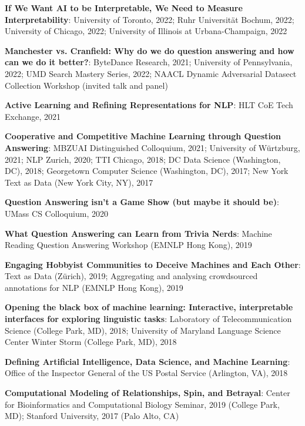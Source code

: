 {{  \begin{enumerate*}
    \item {\bf If We Want AI to be Interpretable, We Need to Measure
        Interpretability}: University of Toronto, 2022; Ruhr
      Universit\"at Bochum, 2022; University of Chicago, 2022;
      University of Illinois at Urbana-Champaign, 2022
    \item {\bf Manchester vs. Cranfield: Why do we do question answering and
how can we do it better?}: ByteDance Research, 2021; University of
Pennsylvania, 2022; UMD Search Mastery Series, 2022; NAACL Dynamic
Adversarial Datasect Collection Workshop (invited talk and panel)
    \item {\bf Active Learning and Refining Representations for NLP}:
      HLT CoE Tech Exchange, 2021
\item {\bf Cooperative and Competitive Machine Learning through
    Question Answering}: MBZUAI Distinguished Colloquium, 2021;
  University of W\"urtzburg, 2021; NLP Zurich, 2020; TTI Chicago, 2018; DC Data Science (Washington, DC), 2018; Georgetown Computer Science (Washington, DC),
  2017; New York Text as Data (New York City, NY), 2017
  \item {\bf Question
      Answering isn't a Game Show (but maybe it should be)}: UMass CS
    Colloquium, 2020
\item {\bf What Question Answering can Learn from Trivia Nerds}:
  Machine Reading Question Answering Workshop (EMNLP Hong Kong), 2019
\item {\bf  Engaging Hobbyist
Communities to Deceive Machines and
Each Other}: Text as Data (Z\"urich), 2019; Aggregating and analysing
crowdsourced annotations for NLP (EMNLP Hong Kong), 2019
\item {\bf Opening the black box of machine learning: Interactive, interpretable interfaces for exploring linguistic tasks}: Laboratory of Telecommunication Science (College Park,
  MD), 2018;  University of Maryland Language Science Center Winter
  Storm (College Park, MD), 2018
\item {\bf Defining Artificial Intelligence, Data Science, and Machine
    Learning}: Office of the Inspector General of the US Postal
  Service (Arlington, VA), 2018
\item {\bf Computational Modeling of Relationships, Spin, and
    Betrayal}: Center for Bioinformatics and Computational Biology
  Seminar, 2019 (College Park, MD); Stanford University, 2017 (Palo
  Alto, CA)

\end{enumerate*}}}
